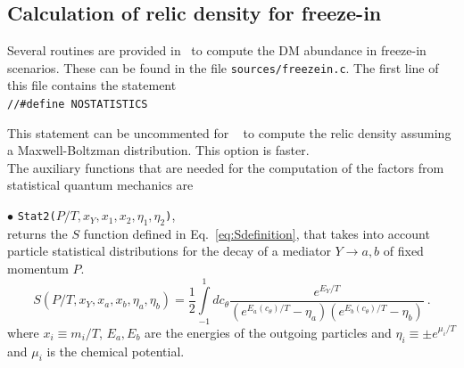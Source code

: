 \documentclass[12pt,a4paper]{article}
\begin{document}
 

\subsection{Calculation of relic density for freeze-in}
\label{sec:routines:freeze-in} 

Several routines are provided in \micro~to compute the DM abundance in freeze-in scenarios. These can be found in the file \verb|sources/freezein.c|. The first line of this file contains the statement \\
\verb|//#define NOSTATISTICS|

\noindent
This statement can be uncommented for \micro~ to compute the relic density assuming a Maxwell-Boltzman distribution. This option is faster. 
\\
The auxiliary functions that are needed for the computation of the factors from statistical quantum mechanics are 

\noindent
$\bullet$ \verb|Stat2(|$P/T,x_Y,x_1,x_2,\eta_1,\eta_2$\verb|)|,\\
 returns the $S$ function defined in Eq.~\eqref{eq:Sdefinition}, that takes into account particle statistical distributions for the decay of a mediator $Y \rightarrow a,b$ of fixed momentum $P$. 
\begin{equation}\label{eq:Sdefinition}
S\left( P/T, x_Y, x_a, x_b, \eta_a, \eta_b \right)= \frac{1}{2}\int\limits_{-1}^{1} dc_{\theta}
\frac{e^{E_Y/T}}{(e^{E_a(c_\theta)/T} - \eta_a)(e^{E_b(c_\theta)/T} - \eta_b)}\ .
\end{equation}
where $x_i \equiv m_i/T$, $E_a,E_b$ are the energies of the outgoing particles and $\eta_i \equiv \pm e^{\mu_i/T}$ and $\mu_i$ is the chemical potential.\\
\end{document}
